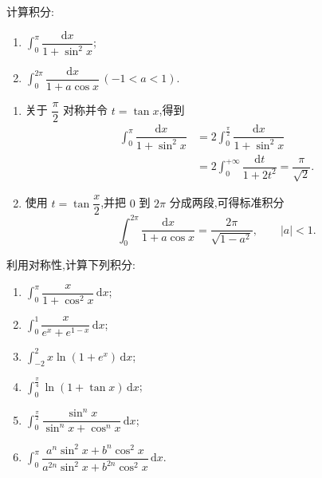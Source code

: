 \begin{example}
    计算积分:
    \begin{enumerate}
        \item $\displaystyle\int_0^\pi\dfrac{\mathrm{d}x}{1+\sin^2x}$;
        \item $\displaystyle\int_0^{2\pi}\dfrac{\mathrm{d}x}{1+a\cos x}\,(-1<a<1)$.
    \end{enumerate}
\end{example}
\exampleblank

\begin{solution}
    \leavevmode
    \begin{enumerate}
        \item 关于 $\dfrac{\pi}{2}$ 对称并令 $t=\tan x$,得到
              \[
                  \begin{aligned}
                      \int_0^\pi\dfrac{\mathrm{d}x}{1+\sin^2x}
                       & =2\int_0^{\frac{\pi}{2}}\dfrac{\mathrm{d}x}{1+\sin^2x} \\
                       & =2\int_0^{+\infty}\dfrac{\mathrm{d}t}{1+2t^2}
                      =\boxed{\dfrac{\pi}{\sqrt2}}.
                  \end{aligned}
              \]
        \item 使用 $t=\tan\dfrac{x}{2}$,并把 $0$ 到 $2\pi$ 分成两段,可得标准积分
              \[
                  \displaystyle\int_0^{2\pi}\dfrac{\mathrm{d}x}{1+a\cos x}
                  =\boxed{\dfrac{2\pi}{\sqrt{1-a^2}}},
                  \qquad |a|<1.
              \]
    \end{enumerate}
\end{solution}

\begin{example}
    利用对称性,计算下列积分:
    \begin{enumerate}
        \item $\displaystyle\int_0^\pi\dfrac{x}{1+\cos^2x}\,\mathrm{d}x$;
        \item $\displaystyle\int_0^1\dfrac{x}{e^x+e^{1-x}}\,\mathrm{d}x$;
        \item $\displaystyle\int_{-2}^{2}x\ln(1+e^x)\,\mathrm{d}x$;
        \item $\displaystyle\int_0^{\frac{\pi}{4}}\ln(1+\tan x)\,\mathrm{d}x$;
        \item $\displaystyle\int_0^{\frac{\pi}{2}}\dfrac{\sin^n x}{\sin^n x+\cos^n x}\,\mathrm{d}x$;
        \item $\displaystyle\int_0^\pi
                  \dfrac{a^n\sin^2x+b^n\cos^2x}{a^{2n}\sin^2x+b^{2n}\cos^2x}\,\mathrm{d}x$.
    \end{enumerate}
\end{example}
\exampleblank

